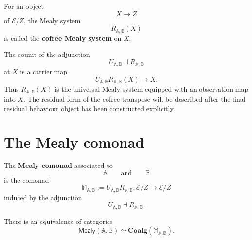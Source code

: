 \begin{definition}
\label{def:cofree-mealy-system}
For an object
\[
X\to Z
\]
of \(\mathcal E/Z\), the Mealy system
\[
R_{\mathbb A,\mathbb B}(X)
\]
is called the \textbf{cofree Mealy system} on \(X\).
\end{definition}

\begin{remark}
\label{rem:cofree-mealy-system-interpretation}
The counit of the adjunction
\[
U_{\mathbb A,\mathbb B}\dashv R_{\mathbb A,\mathbb B}
\]
at \(X\) is a carrier map
\[
U_{\mathbb A,\mathbb B}R_{\mathbb A,\mathbb B}(X)\to X.
\]
Thus \(R_{\mathbb A,\mathbb B}(X)\) is the universal Mealy system equipped
with an observation map into \(X\). The residual form of the cofree transpose
will be described after the final residual behaviour object has been
constructed explicitly.
\end{remark}

\section{The Mealy comonad}
\label{sec:mealy-comonad}

\begin{definition}
\label{def:mealy-comonad}
The \textbf{Mealy comonad} associated to
\[
\mathbb A
\qquad\text{and}\qquad
\mathbb B
\]
is the comonad
\[
\mathbb M_{\mathbb A,\mathbb B}
:=
U_{\mathbb A,\mathbb B}R_{\mathbb A,\mathbb B}
:
\mathcal E/Z\to\mathcal E/Z
\]
induced by the adjunction
\[
U_{\mathbb A,\mathbb B}\dashv R_{\mathbb A,\mathbb B}.
\]
\end{definition}

\begin{theorem}
\label{thm:mealy-systems-are-comonad-coalgebras}
There is an equivalence of categories
\[
\mathsf{Mealy}(\mathbb A,\mathbb B)
\simeq
\mathbf{Coalg}(\mathbb M_{\mathbb A,\mathbb B}).
\]
\end{theorem}

